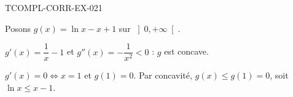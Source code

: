 \begin{corrige}{TCOMPL-CORR-EX-021}

Posons $g(x) = \ln x - x + 1$ sur $\left]0, +\infty\right[$.


$g'(x) = \dfrac{1}{x} - 1$ et $g''(x) = -\dfrac{1}{x^2} < 0$ : $g$ est concave.

$g'(x) = 0 \iff x = 1$ et $g(1) = 0$. Par concavité, $g(x) \leq g(1) = 0$, soit $\ln x \leq x - 1$.

\end{corrige}
